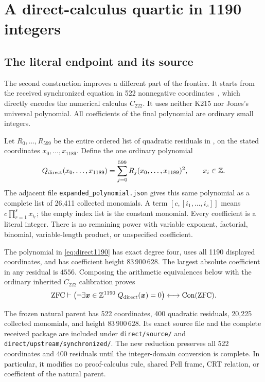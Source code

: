 \section{A direct-calculus quartic in 1190 integers}\label{sec:direct}

\subsection{The literal endpoint and its source}

The second construction improves a different part of the frontier. It
starts from the received synchronized equation in 522 nonnegative
coordinates~\cite{sync}, which directly encodes the numerical calculus
$C_{222}$. It uses neither K215 nor Jones's universal polynomial. All
coefficients of the final polynomial are ordinary small integers.

Let $R_0,\ldots,R_{599}$ be the entire ordered list of quadratic residuals
in , on the stated coordinates
$x_0,\ldots,x_{1189}$. Define the one ordinary polynomial
\begin{equation}\label{eq:direct1190}
 Q_{\mathrm{direct}}(x_0,\ldots,x_{1189})
   =\sum_{j=0}^{599}R_j(x_0,\ldots,x_{1189})^2,
 \qquad x_i\in\mathbb Z.
\end{equation}
The adjacent file \texttt{expanded\_polynomial.json} gives this same
polynomial as a complete list of 26,411 collected monomials. A term
$[c,[i_1,\ldots,i_s]]$ means $c\prod_{r=1}^{s}x_{i_r}$; the empty index
list is the constant monomial. Every coefficient is a literal integer.
There is no remaining power with variable exponent, factorial, binomial,
variable-length product, or unspecified coefficient.

\begin{theorem}\label{thm:direct1190}
The polynomial in \eqref{eq:direct1190} has exact degree four, uses all
1190 displayed coordinates, and has coefficient height $83\,900\,628$.
The largest absolute coefficient in any residual is $4556$.
Composing the arithmetic equivalences below with the ordinary inherited
$C_{222}$ calibration proves
\[
 \mathrm{ZFC}\vdash
 \left(\neg\exists\boldsymbol x\in\mathbb Z^{1190}\;
                   Q_{\mathrm{direct}}(\boldsymbol x)=0\right)
 \longleftrightarrow\operatorname{Con}(\mathrm{ZFC}).
\]
\end{theorem}

The frozen natural parent has 522 coordinates, 400 quadratic residuals,
20,225 collected monomials, and height $83\,900\,628$. Its exact source
file and the complete received package are included under
\texttt{direct/source/} and \texttt{direct/upstream/synchronized/}.
The new reduction preserves all 522 coordinates and 400 residuals until
the integer-domain conversion is complete. In particular, it modifies
no proof-calculus rule, shared Pell frame, CRT relation, or coefficient
of the natural parent.

